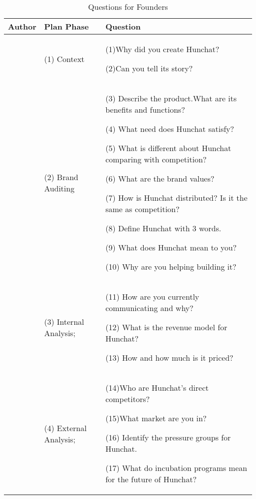 \documentclass[12pt]{article}
\begin{document}
\begin{table}[htb]
\small
\caption{Questions for Founders}
\label{table:founder}
\centering
\begin{tabular}{ @{}P{0.15\textwidth}P{0.2\textwidth}P{0.6\textwidth}@{} }
Author                      & Plan Phase             & Question                                                                                                                                                                                                                                                                                                                                                                                                                         \\ \hline
  &  (1) Context & (1)Why did you create Hunchat? \par (2)Can you tell its story? \\ 
\cite{kliatchko}             & (2) Brand Auditing     & (3) Describe the product.What are its benefits and functions? \par (4) What need does Hunchat satisfy? \par (5) What is different about Hunchat comparing with competition? \par (6) What are the brand values?   \par (7) How is Hunchat distributed? Is it the same as competition?   \par (8) Define Hunchat with 3 words.   \par (9) What does Hunchat mean to you?    \par (10) Why are you helping building it? 
\\
 \hline
 		       & (3) Internal Analysis; &  (11) How are you currently communicating and why?   \par  (12) What is the revenue model for Hunchat?   \par  (13) How and how much is it priced?                                                                                                                                                                                                                                                \\
 \cite{clow}                           & (4) External Analysis; & (14)Who are Hunchat’s direct competitors?   \par  (15)What market are you in?   \par  (16) Identify the pressure groups for Hunchat.   \par (17) What do incubation programs mean for the future of Hunchat?                                                                                                                                                                                             \\

\end{tabular}
\end{table}
\end{document}
